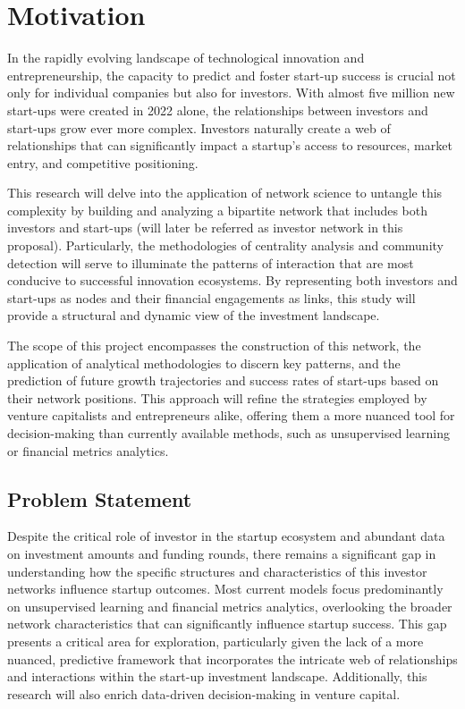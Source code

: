 \documentclass[a4paper,11pt]{article}
\begin{document}
\section{Motivation}
In the rapidly evolving landscape of technological innovation and entrepreneurship, the capacity to predict and foster start-up success is crucial not only for individual companies but also for investors. With almost five million new start-ups were created in 2022 alone, the relationships between investors and start-ups grow ever more complex. Investors naturally create a web of relationships that can significantly impact a startup’s access to resources, market entry, and competitive positioning.

This research will delve into the application of network science to untangle this complexity by building and analyzing a bipartite network that includes both investors and start-ups (will later be referred as investor network in this proposal). Particularly, the methodologies of centrality analysis and community detection will serve to illuminate the patterns of interaction that are most conducive to successful innovation ecosystems. By representing both investors and start-ups as nodes and their financial engagements as links, this study will provide a structural and dynamic view of the investment landscape.

The scope of this project encompasses the construction of this network, the application of analytical methodologies to discern key patterns, and the prediction of future growth trajectories and success rates of start-ups based on their network positions. This approach will refine the strategies employed by venture capitalists and entrepreneurs alike, offering them a more nuanced tool for decision-making than currently available methods, such as unsupervised learning or financial metrics analytics.

\subsection{Problem Statement}
Despite the critical role of investor in the startup ecosystem and abundant data on investment amounts and funding rounds, there remains a significant gap in understanding how the specific structures and characteristics of this investor networks influence startup outcomes. Most current models focus predominantly on unsupervised learning and financial metrics analytics, overlooking the broader network characteristics that can significantly influence startup success. This gap presents a critical area for exploration, particularly given the lack of a more nuanced, predictive framework that incorporates the intricate web of relationships and interactions within the start-up investment landscape. Additionally, this research will also enrich data-driven decision-making in venture capital.
\end{document}
